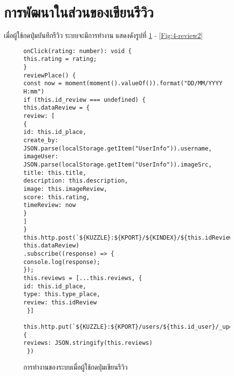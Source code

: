 \section{การพัฒนาในส่วนของเขียนรีวิว}
เมื่อผู้ใช้กดปุ่มบันทึกรีวิว ระบบจะมีการทำงาน แสดงดังรูปที่ \ref{Fig:4-review} - \ref{Fig:4-review2}
\begin{figure}[H]
{\begin{lstlisting}
onClick(rating: number): void {
this.rating = rating;
}
reviewPlace() {
const now = moment(moment().valueOf()).format("DD/MM/YYYY H:mm")
if (this.id_review === undefined) {
this.dataReview = {
review: [
{
id: this.id_place,
create_by: JSON.parse(localStorage.getItem("UserInfo")).username,
imageUser: JSON.parse(localStorage.getItem("UserInfo")).imageSrc,
title: this.title,
description: this.description,
image: this.imageReview,
score: this.rating,
timeReview: now
}
]
}
this.http.post(`${KUZZLE}:${KPORT}/${KINDEX}/${this.idReview}/${this.id_place}/_create`, this.dataReview)
.subscribe((response) => {
console.log(response);
});
this.reviews = [...this.reviews, {
id: this.id_place,
type: this.type_place,
review: this.idReview
 }]
 this.http.put(`${KUZZLE}:${KPORT}/users/${this.id_user}/_update`, {
reviews: JSON.stringify(this.reviews)
 })
\end{lstlisting}}
\caption{การทำงานของระบบเมื่อผู้ใช้กดปุ่มเขียนรีวิว}
\label{Fig:4-review}
\end{figure}
\newpage

